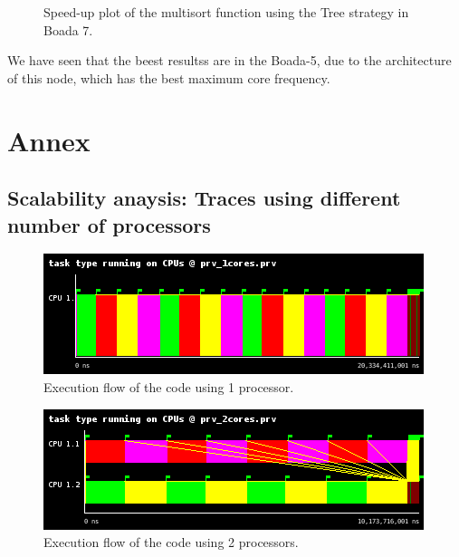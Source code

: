 \documentclass[12pt, a4paper]{article}
\begin{document}
\begin{figure}[H]
\begin{minipage}[b]{0.4\linewidth}
  \caption{Speed-up plot of the multisort function using the Tree strategy in Boada 7.}
  \label{fig:mandel-omp-10000-strong-21-speedup}
\end{minipage}
\end{figure}

We have seen that the beest resultss are in the Boada-5, due to the architecture of this node, which has the best maximum core frequency.

\section{Annex}

\subsection{Scalability anaysis: Traces using different number of processors}

\begin{figure}[H]
	\centering
	\includegraphics[scale=0.75]{./images/S1_scalability/S1_scalability_1}
	
	\label{fig_ann:S1_scalability_1}
	\caption{Execution flow of the code using 1 processor.}
\end{figure}





\begin{figure}[H]
	\centering
	\includegraphics[scale=0.75]{./images/S1_scalability/S1_scalability_2}
	
	\label{fig_ann:S1_scalability_2}
	\caption{Execution flow of the code using 2 processors.}
\end{figure}
\end{document}
